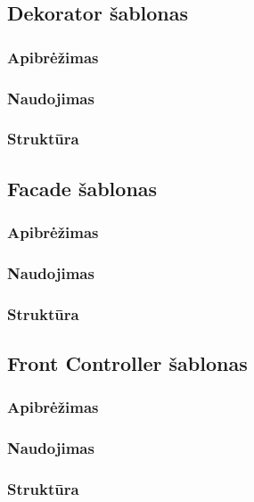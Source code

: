 \documentclass[10pt]{IEEEtran}
\begin{document}
		\subsection{Dekorator šablonas}

			\subsubsection{Apibrėžimas}

			\subsubsection{Naudojimas}

			\subsubsection{Struktūra}

		\subsection{Facade šablonas}

			\subsubsection{Apibrėžimas}

			\subsubsection{Naudojimas}

			\subsubsection{Struktūra}

		\subsection{Front Controller šablonas}

			\subsubsection{Apibrėžimas}

			\subsubsection{Naudojimas}

			\subsubsection{Struktūra}
\end{document}
